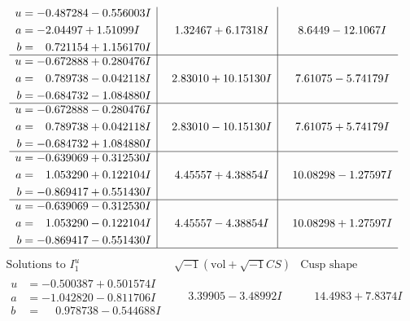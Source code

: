 \documentclass[1p]{elsarticle_modified}
\theoremstyle{definition}
\newcommand{\I}{\sqrt{-1}}
\begin{document}
$$\begin{array}{c|c|c}
\begin{aligned}
u &= -0.487284 - 0.556003 I \\
a &= -2.04497 + 1.51099 I \\
b &= \phantom{-}0.721154 + 1.156170 I\end{aligned}
 & \phantom{-}1.32467 + 6.17318 I & \phantom{-}8.6449 - 12.1067 I \\ \hline\begin{aligned}
u &= -0.672888 + 0.280476 I \\
a &= \phantom{-}0.789738 - 0.042118 I \\
b &= -0.684732 - 1.084880 I\end{aligned}
 & \phantom{-}2.83010 + 10.15130 I & \phantom{-}7.61075 - 5.74179 I \\ \hline\begin{aligned}
u &= -0.672888 - 0.280476 I \\
a &= \phantom{-}0.789738 + 0.042118 I \\
b &= -0.684732 + 1.084880 I\end{aligned}
 & \phantom{-}2.83010 - 10.15130 I & \phantom{-}7.61075 + 5.74179 I \\ \hline\begin{aligned}
u &= -0.639069 + 0.312530 I \\
a &= \phantom{-}1.053290 + 0.122104 I \\
b &= -0.869417 + 0.551430 I\end{aligned}
 & \phantom{-}4.45557 + 4.38854 I & \phantom{-}10.08298 - 1.27597 I \\ \hline\begin{aligned}
u &= -0.639069 - 0.312530 I \\
a &= \phantom{-}1.053290 - 0.122104 I \\
b &= -0.869417 - 0.551430 I\end{aligned}
 & \phantom{-}4.45557 - 4.38854 I & \phantom{-}10.08298 + 1.27597 I\\
 \hline 
 \end{array}$$\newpage$$\begin{array}{c|c|c}  
\text{Solutions to }I^u_{1}& \I (\text{vol} + \sqrt{-1}CS) & \text{Cusp shape}\\
 \hline 
\begin{aligned}
u &= -0.500387 + 0.501574 I \\
a &= -1.042820 - 0.811706 I \\
b &= \phantom{-}0.978738 - 0.544688 I\end{aligned}
 & \phantom{-}3.39905 - 3.48992 I & \phantom{-}14.4983 + 7.8374 I \\ \hline\begin{aligned}

\end{aligned}
\end{array}$$
\end{document}
